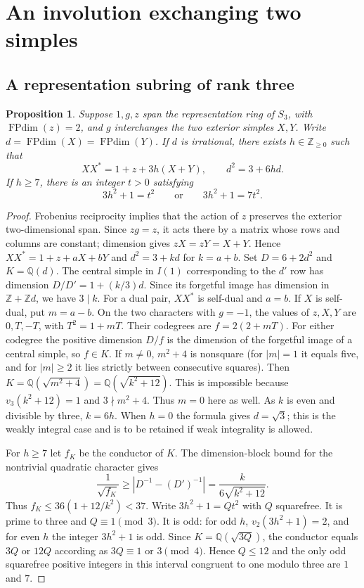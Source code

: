 \documentclass[11pt,a4paper]{article}
\newtheorem{proposition}[theorem]{Proposition}
\numberwithin{equation}{section}
\begin{document}
\section{An involution exchanging two simples}
\subsection{A representation subring of rank three}

\begin{proposition}\label{prop:s3-swap-pell}
Suppose $1,g,z$ span the representation ring of $S_3$, with
$\operatorname{FPdim}(z)=2$, and $g$ interchanges the two exterior
simples $X,Y$. Write $d=\operatorname{FPdim}(X)=\operatorname{FPdim}(Y)$.
If $d$ is irrational, there exists $h\in\mathbb Z_{\ge0}$ such that
\[
 XX^*=1+z+3h(X+Y),\qquad d^2=3+6hd.
\]
If $h\ge7$, there is an integer $t>0$ satisfying
\[
 3h^2+1=t^2\qquad\text{or}\qquad 3h^2+1=7t^2 .
\]
\end{proposition}
\begin{proof}
Frobenius reciprocity implies that the action of $z$ preserves the
exterior two-dimensional span. Since $zg=z$, it acts there by a
matrix whose rows and columns are constant; dimension gives $zX=zY=X+Y$.
Hence $XX^*=1+z+aX+bY$ and $d^2=3+kd$ for $k=a+b$.
Set $D=6+2d^2$ and $K=\mathbb Q(d)$.
The central simple in
$I(1)$ corresponding to the $d'$ row has dimension
$D/D'=1+(k/3)d$. Since its forgetful image has dimension in
$\mathbb Z+\mathbb Zd$, we have $3\mid k$.
For a dual pair, $XX^*$ is self-dual and $a=b$.
If $X$ is self-dual, put $m=a-b$. On the two characters with
$g=-1$, the values of $z,X,Y$ are $0,T,-T$, with
$T^2=1+mT$. Their codegrees are $f=2(2+mT)$.
For either codegree the positive dimension $D/f$ is the
dimension of the forgetful image of a central simple, so $f\in K$.
If $m\ne0$, $m^2+4$ is nonsquare (for $|m|=1$ it equals five,
and for $|m|\ge2$ it lies strictly between consecutive squares).
Then $K=\mathbb Q(\sqrt{m^2+4})=\mathbb Q(\sqrt{k^2+12})$.
This is impossible because $v_3(k^2+12)=1$ and $3\nmid m^2+4$.
Thus $m=0$ here as well. As $k$ is even and divisible by three,
$k=6h$. When $h=0$ the formula gives $d=\sqrt3$; this is the
weakly integral case and is to be retained if weak integrality is
allowed.

For $h\ge7$ let $f_K$ be the conductor of $K$. The dimension-block
bound for the nontrivial quadratic character gives
\[
 \frac1{\sqrt{f_K}}\ge |D^{-1}-(D')^{-1}|
   =\frac{k}{6\sqrt{k^2+12}} .
\]
Thus $f_K\le36(1+12/k^2)<37$. Write $3h^2+1=Qt^2$
with $Q$ squarefree. It is prime to three and $Q\equiv1\pmod3$.
It is odd: for odd $h$, $v_2(3h^2+1)=2$, and for even $h$
the integer $3h^2+1$ is odd. Since $K=\mathbb Q(\sqrt{3Q})$,
the conductor equals $3Q$ or $12Q$ according as $3Q\equiv1$
or $3\pmod4$. Hence $Q\le12$ and the only odd squarefree
positive integers in this interval congruent to one modulo three
are $1$ and $7$.
\end{proof}
\end{document}
